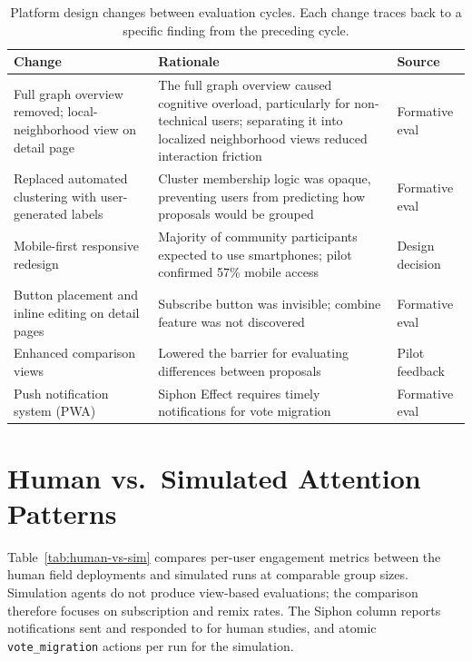 \documentclass[a4paper, 12pt, twoside]{iviathesis}
\begin{document}
\begin{table}[htbp]
\centering
\caption{Platform design changes between evaluation cycles. Each change traces back to a specific finding from the preceding cycle.}
\label{tab:platform-evolution}
\begin{tabularx}{\textwidth}{p{4cm}Xl}
\toprule
Change & Rationale & Source \\
\midrule
Full graph overview removed; local-neighborhood view on detail page & The full graph overview caused cognitive overload, particularly for non-technical users; separating it into localized neighborhood views reduced interaction friction & Formative eval \\
\midrule
Replaced automated clustering with user-generated labels & Cluster membership logic was opaque, preventing users from predicting how proposals would be grouped & Formative eval \\
\midrule
Mobile-first responsive redesign & Majority of community participants expected to use smartphones; pilot confirmed 57\% mobile access & Design decision \\
\midrule
Button placement and inline editing on detail pages & Subscribe button was invisible; combine feature was not discovered & Formative eval \\
\midrule
Enhanced comparison views & Lowered the barrier for evaluating differences between proposals & Pilot feedback \\
\midrule
Push notification system (PWA) & Siphon Effect requires timely notifications for vote migration & Formative eval \\
\bottomrule
\end{tabularx}
\end{table}

\section{Human vs.\ Simulated Attention Patterns}
\label{sec:human-vs-sim}

Table~\ref{tab:human-vs-sim} compares per-user engagement metrics between the human field deployments and simulated runs at comparable group sizes. Simulation agents do not produce view-based evaluations; the comparison therefore focuses on subscription and remix rates. The Siphon column reports notifications sent and responded to for human studies, and atomic \texttt{vote\_migration} actions per run for the simulation.
\end{document}
